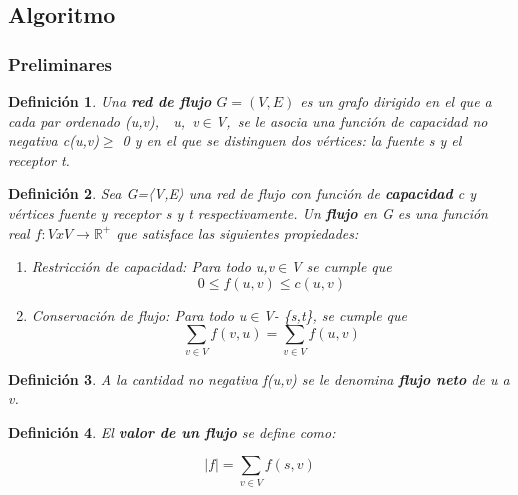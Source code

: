 \documentclass[10pt]{article} %
\newtheorem{mydef}{Definici\'on}%
\begin{document}
	\subsection{Algoritmo}
	
	\subsubsection{Preliminares}
	\begin{mydef}
		Una \textbf{red de flujo} $G=(V,E)$ es un grafo dirigido en el que a cada par ordenado (u,v),  u, v$\in$V, se le asocia una función de capacidad no negativa c(u,v)$\geq$ 0 y en el que se distinguen dos vértices: la fuente s y el receptor t.
	\end{mydef}

	\begin{mydef}
		Sea G=〈V,E〉 una red de flujo con función de \textbf{capacidad} c y vértices fuente y receptor s y t respectivamente. Un \textbf{flujo} en G es una función real $f:V x V\rightarrow \mathbb{R}^+$ que satisface las siguientes propiedades:
		
		\begin{enumerate}
			\item Restricci\'on de capacidad: Para todo u,v$\in$V se cumple que
			\begin{equation}
				0 \leq f(u,v) \leq c(u,v)
			\end{equation}
		
			\item Conservaci\'on de flujo: Para todo u$\in$V- \{s,t\}, se cumple que
			\begin{equation}
				\sum_{v \in V} f(v,u) = \sum_{v \in V} f(u,v)
			\end{equation}
			
		\end{enumerate}
		
	\end{mydef}

	\begin{mydef}
		A la cantidad  no negativa f(u,v) se le denomina \textbf{flujo neto} de u a v.
	\end{mydef}

	\begin{mydef}
		El \textbf{valor de un flujo} se define como:
		
		\begin{equation}
			|f|=\sum_{v \in V} f(s,v)
		\end{equation}
	\end{mydef}
\end{document}
